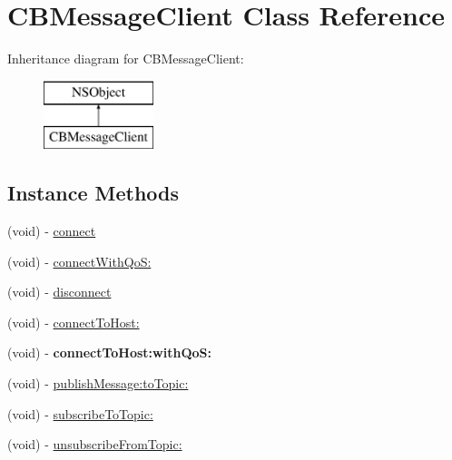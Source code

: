 \hypertarget{interface_c_b_message_client}{\section{C\+B\+Message\+Client Class Reference}
\label{interface_c_b_message_client}
}
Inheritance diagram for C\+B\+Message\+Client\+:\begin{figure}[H]
\begin{center}
\leavevmode
\includegraphics[height=2.000000cm]{interface_c_b_message_client}
\end{center}
\end{figure}
\subsection*{Instance Methods}
\begin{DoxyCompactItemize}
\item 
(void) -\/ \hyperlink{interface_c_b_message_client_a98951fb3c734b7f2dfc4ef3607f54b8d}{connect}
\item 
(void) -\/ \hyperlink{interface_c_b_message_client_ad3fc84eac6cbdef60ee25f5e5a76195f}{connect\+With\+Qo\+S\+:}
\item 
(void) -\/ \hyperlink{interface_c_b_message_client_aacd81270fa332e1a1f534f5ccd51eac8}{disconnect}
\item 
(void) -\/ \hyperlink{interface_c_b_message_client_aa4f3f4ff5be3929038bf6045846738cf}{connect\+To\+Host\+:}
\item 
\hypertarget{interface_c_b_message_client_a783328bc604af291da0d49a8cca8cc26}{(void) -\/ {\bfseries connect\+To\+Host\+:with\+Qo\+S\+:}}\label{interface_c_b_message_client_a783328bc604af291da0d49a8cca8cc26}

\item 
(void) -\/ \hyperlink{interface_c_b_message_client_abcbd056a8bdffbb5c00299343c1b0aeb}{publish\+Message\+:to\+Topic\+:}
\item 
(void) -\/ \hyperlink{interface_c_b_message_client_a5a2d3e7f602801310df4c29fef97c85e}{subscribe\+To\+Topic\+:}
\item 
(void) -\/ \hyperlink{interface_c_b_message_client_a2d09ed72620aad690bbc38a7042106b5}{unsubscribe\+From\+Topic\+:}
\end{DoxyCompactItemize}

